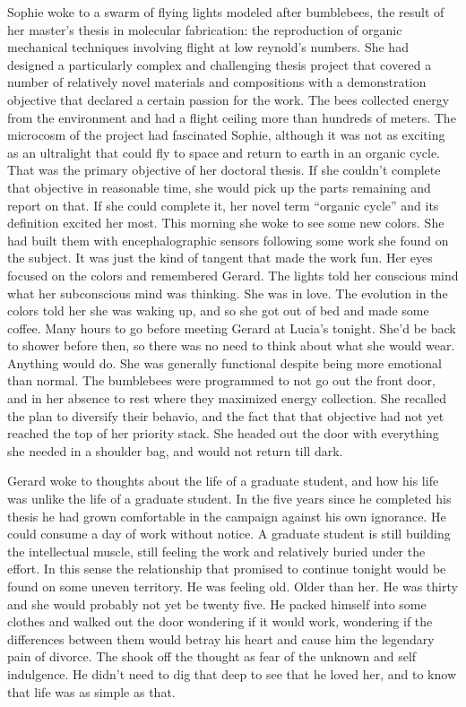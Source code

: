 Sophie woke to a swarm of flying lights modeled after bumblebees, the
result of her master's thesis in molecular fabrication: the
reproduction of organic mechanical techniques involving flight at low
reynold's numbers.  She had designed a particularly complex and
challenging thesis project that covered a number of relatively novel
materials and compositions with a demonstration objective that
declared a certain passion for the work.  The bees collected energy
from the environment and had a flight ceiling more than hundreds of
meters.  The microcosm of the project had fascinated Sophie, although
it was not as exciting as an ultralight that could fly to space and
return to earth in an organic cycle.  That was the primary objective
of her doctoral thesis.  If she couldn't complete that objective in
reasonable time, she would pick up the parts remaining and report on
that.  If she could complete it, her novel term ``organic cycle'' and
its definition excited her most.  This morning she woke to see some
new colors.  She had built them with encephalographic sensors
following some work she found on the subject.  It was just the kind of
tangent that made the work fun.  Her eyes focused on the colors and
remembered Gerard.  The lights told her conscious mind what her
subconscious mind was thinking.  She was in love.  The evolution in
the colors told her she was waking up, and so she got out of bed and
made some coffee.  Many hours to go before meeting Gerard at Lucia's
tonight.  She'd be back to shower before then, so there was no need to
think about what she would wear.  Anything would do.  She was
generally functional despite being more emotional than normal.  The
bumblebees were programmed to not go out the front door, and in her
absence to rest where they maximized energy collection.  She recalled
the plan to diversify their behavio, and the fact that that objective
had not yet reached the top of her priority stack.  She headed out the
door with everything she needed in a shoulder bag, and would not
return till dark.



Gerard woke to thoughts about the life of a graduate student, and how
his life was unlike the life of a graduate student.  In the five years
since he completed his thesis he had grown comfortable in the campaign
against his own ignorance.  He could consume a day of work without
notice.  A graduate student is still building the intellectual muscle,
still feeling the work and relatively buried under the effort.  In
this sense the relationship that promised to continue tonight would be
found on some uneven territory.  He was feeling old.  Older than her.
He was thirty and she would probably not yet be twenty five.  He
packed himself into some clothes and walked out the door wondering if
it would work, wondering if the differences between them would betray
his heart and cause him the legendary pain of divorce.  The shook off
the thought as fear of the unknown and self indulgence.  He didn't
need to dig that deep to see that he loved her, and to know that life
was as simple as that.



